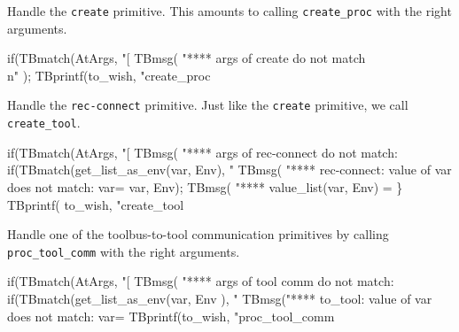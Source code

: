 
Handle the {\tt create} primitive. This amounts to calling {\tt create\_proc}
with the right arguments.

\nwenddocs{}\endmoddef
  if(TBmatch(AtArgs, "[%
    TBmsg( "**** args of create do not match\\n" );
  TBprintf(to_wish, "create_proc %
\nwendcode{}\nwdocspar


Handle the {\tt rec-connect} primitive. Just like the {\tt create} primitive,
we call {\tt create\_tool}.

\nwenddocs{}\endmoddef
  if(TBmatch(AtArgs, "[%
    TBmsg( "**** args of rec-connect do not match: %
  if(TBmatch(get_list_as_env(var, Env), "%
    TBmsg( "**** rec-connect: value of var does not match: var=%
                                                                    var, Env);
    TBmsg( "**** value_list(var, Env) = %
  \}
  TBprintf( to_wish, "create_tool %
\nwendcode{}\nwdocspar


Handle one of the toolbus-to-tool communication primitives
by calling {\tt proc\_tool\_comm} with the right arguments.

\nwenddocs{}\endmoddef
  if(TBmatch(AtArgs, "[%
    TBmsg( "**** args of tool comm do not match:%
  if(TBmatch(get_list_as_env(var, Env ), "%
    TBmsg("**** to_tool: value of var does not match: var=%
  TBprintf(to_wish, "proc_tool_comm %
\nwendcode{}\nwdocspar


